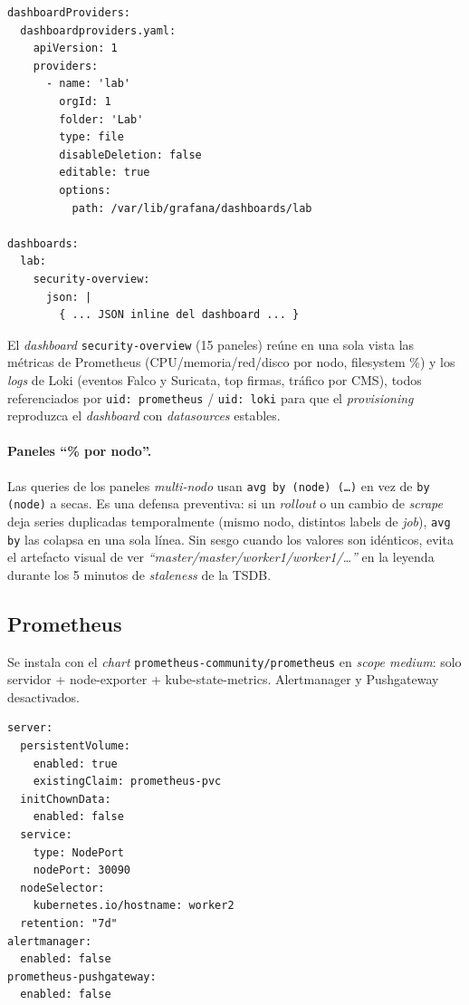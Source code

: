 \begin{lstlisting}[style=yaml]
dashboardProviders:
  dashboardproviders.yaml:
    apiVersion: 1
    providers:
      - name: 'lab'
        orgId: 1
        folder: 'Lab'
        type: file
        disableDeletion: false
        editable: true
        options:
          path: /var/lib/grafana/dashboards/lab

dashboards:
  lab:
    security-overview:
      json: |
        { ... JSON inline del dashboard ... }
\end{lstlisting}

El \emph{dashboard} \texttt{security-overview} (15 paneles) reúne en una sola vista las métricas de Prometheus (CPU/memoria/red/disco por nodo, filesystem \%) y los \emph{logs} de Loki (eventos Falco y Suricata, top firmas, tráfico por CMS), todos referenciados por \texttt{uid: prometheus} / \texttt{uid: loki} para que el \emph{provisioning} reproduzca el \emph{dashboard} con \emph{datasources} estables.

\paragraph{Paneles ``\% por nodo''.} Las queries de los paneles \emph{multi-nodo} usan \texttt{avg by (node) (\dots)} en vez de \texttt{by (node)} a secas. Es una defensa preventiva: si un \emph{rollout} o un cambio de \emph{scrape} deja series duplicadas temporalmente (mismo nodo, distintos labels de \emph{job}), \texttt{avg by} las colapsa en una sola línea. Sin sesgo cuando los valores son idénticos, evita el artefacto visual de ver \emph{``master/master/worker1/worker1/\dots''} en la leyenda durante los 5 minutos de \emph{staleness} de la TSDB.

\subsection{Prometheus}

Se instala con el \emph{chart} \texttt{prometheus-community/prometheus} en \emph{scope medium}: solo servidor + node-exporter + kube-state-metrics. Alertmanager y Pushgateway desactivados.

\begin{lstlisting}[style=yaml]
server:
  persistentVolume:
    enabled: true
    existingClaim: prometheus-pvc
  initChownData:
    enabled: false
  service:
    type: NodePort
    nodePort: 30090
  nodeSelector:
    kubernetes.io/hostname: worker2
  retention: "7d"
alertmanager:
  enabled: false
prometheus-pushgateway:
  enabled: false
\end{lstlisting}

